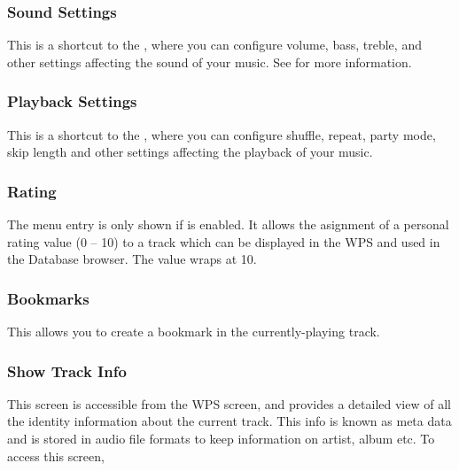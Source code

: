 \subsubsection{Sound Settings}
This is a shortcut to the , where you can configure volume,
bass, treble, and other settings affecting the sound of your music.  
See  for more information.

\subsubsection{Playback Settings}
This is a shortcut to the , where you can configure shuffle,
repeat, party mode, skip length and other settings affecting the playback of your music.  

\subsubsection{Rating}
The menu entry is only shown if  is
enabled. It allows the asignment of a personal rating value (0 -- 10)
to a track which can be displayed in the WPS and used in the Database
browser. The value wraps at 10.

\subsubsection{Bookmarks}
This allows you to create a bookmark in the currently-playing track.

\subsubsection{\label{ref:trackinfoviewer}Show Track Info}
This screen is accessible from the WPS screen, and provides a detailed view of
all the identity information about the current track. This info is known as
meta data and is stored in audio file formats to keep information on artist,
album etc. To access this screen, %
%
%
%

